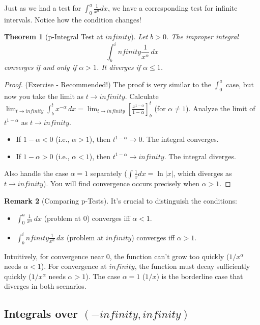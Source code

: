 \documentclass[11pt]{article}
\def\infty{infinity}%
\newtheorem{theorem}{Theorem}[section]
\theoremstyle{definition}
\newtheorem{remark}[theorem]{Remark}
\newcommand{\dx}{\, dx} %
\begin{document}
Just as we had a test for $\int_0^a \frac{1}{x^\alpha} dx$, we have a corresponding test for infinite intervals. Notice how the condition changes!

\begin{theorem}[p-Integral Test at $\infty$]
    Let $b > 0$. The improper integral
    \[
    \int_b^\infty \frac{1}{x^\alpha} \dx
    \]
    converges if and only if $\alpha > 1$. It diverges if $\alpha \le 1$.
\end{theorem}
\begin{proof} (Exercise - Recommended!)
    The proof is very similar to the $\int_0^a$ case, but now you take the limit as $t \to \infty$.
    Calculate $\lim_{t \to \infty} \int_b^t x^{-\alpha} \dx = \lim_{t \to \infty} \left[ \frac{x^{1-\alpha}}{1-\alpha} \right]_b^t$ (for $\alpha \neq 1$).
    Analyze the limit of $t^{1-\alpha}$ as $t \to \infty$.
    \begin{itemize}
        \item If $1-\alpha < 0$ (i.e., $\alpha > 1$), then $t^{1-\alpha} \to 0$. The integral converges.
        \item If $1-\alpha > 0$ (i.e., $\alpha < 1$), then $t^{1-\alpha} \to \infty$. The integral diverges.
    \end{itemize}
    Also handle the case $\alpha = 1$ separately ($\int \frac{1}{x} dx = \ln|x|$, which diverges as $t \to \infty$).
    You will find convergence occurs precisely when $\alpha > 1$.
\end{proof}

\begin{remark}[Comparing p-Tests]
    It's crucial to distinguish the conditions:
    \begin{itemize}
        \item $\int_0^a \frac{1}{x^\alpha} \dx$ (problem at 0) converges iff $\alpha < 1$.
        \item $\int_b^\infty \frac{1}{x^\alpha} \dx$ (problem at $\infty$) converges iff $\alpha > 1$.
    \end{itemize}
    Intuitively, for convergence near 0, the function can't grow too quickly ($1/x^\alpha$ needs $\alpha < 1$). For convergence at $\infty$, the function must decay sufficiently quickly ($1/x^\alpha$ needs $\alpha > 1$). The case $\alpha=1$ ($1/x$) is the borderline case that diverges in both scenarios.
\end{remark}

\subsection{Integrals over $(-\infty, \infty)$}
\end{document}
